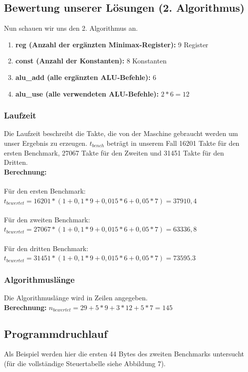 \documentclass[12pt,titlepage]{article}
\begin{document}
\newpage

\subsection{Bewertung unserer Lösungen (2. Algorithmus)}

Nun schauen wir uns den 2. Algorithmus an.

\begin{enumerate}
\item \textbf{reg (Anzahl der ergänzten Minimax-Register): } 9 Register
\item \textbf{const (Anzahl der Konstanten): } 8 Konstanten
\item \textbf{alu\_add (alle erg{\"a}nzten ALU-Befehle):} 6
\item \textbf{alu\_use (alle verwendeten ALU-Befehle):} $2*6=12$
\end{enumerate}

\subsubsection{Laufzeit}
Die Laufzeit beschreibt die Takte, die von der Maschine gebraucht werden um unser Ergebnis zu erzeugen. $t_{bench}$ beträgt in unserem Fall 16201 Takte für den ersten Benchmark, 27067 Takte für den Zweiten und 31451 Takte für den Dritten.\\

\textbf{Berechnung:}\\\\
Für den ersten Benchmark: $t_{bewertet} = 16201 * (1 + 0,1*9 + 0,015*6 + 0,05 * 7) = 37910,4$\\\\
Für den zweiten Benchmark: $t_{bewertet} = 27067 * (1 + 0,1*9 + 0,015*6 + 0,05 * 7) = 63336,8$\\\\
Für den dritten Benchmark: $t_{bewertet} = 31451 * (1 + 0,1*9 + 0,015*6 + 0,05 * 7) = 73595.3$\\

\subsubsection{Algorithmuslänge}
Die Algorithmuslänge wird in Zeilen angegeben.\\

\textbf{Berechnung:} $n_{bewertet} = 29 + 5*9 + 3*12 + 5*7 = 145$


\newpage

\subsection{Programmdruchlauf}
Als Beispiel werden hier die ersten 44 Bytes des zweiten Benchmarks untersucht (für die vollständige Steuertabelle siehe Abbildung 7).
\end{document}
